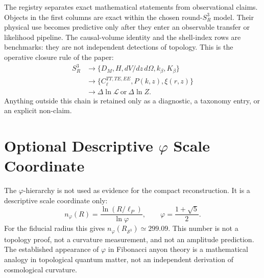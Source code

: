 \documentclass[aps,prd,onecolumn,superscriptaddress,longbibliography,nofootinbib,notitlepage]{revtex4-2}
\begin{document}
The registry separates exact mathematical statements from observational claims.
Objects in the first columns are exact within the chosen round-$S^3_R$ model.
Their physical use becomes predictive only after they enter an observable transfer
or likelihood pipeline. The causal-volume identity and the shell-index rows are
benchmarks: they are not independent detections of topology. This is the operative
closure rule of the paper:
\begin{equation}
\begin{aligned}
  S^3_R
  &\longrightarrow
  \{D_M,H,dV/dz\,d\Omega,k_\beta,K_\beta\} \\
  &\longrightarrow
  \{C_\ell^{TT,TE,EE},P(k,z),\xi(r,z)\} \\
  &\longrightarrow
  \Delta\ln\mathcal L\ \text{or}\ \Delta\ln Z .
\end{aligned}
\end{equation}
Anything outside this chain is retained only as a diagnostic, a taxonomy entry,
or an explicit non-claim.

\clearpage

\section{Optional Descriptive \texorpdfstring{$\varphi$}{phi} Scale Coordinate}
\label{app:phi-coordinate}

The $\varphi$-hierarchy is not used as evidence for the compact reconstruction. It is a
descriptive scale coordinate only:
\begin{equation}
  n_\varphi(R)=\frac{\ln(R/\ell_P)}{\ln\varphi},
  \qquad
  \varphi=\frac{1+\sqrt5}{2}.
\end{equation}
For the fiducial radius this gives $n_\varphi(R_{\mathcal S^3})\simeq299.09$. This
number is not a topology proof, not a curvature measurement, and not an amplitude
prediction. The established appearance of $\varphi$ in Fibonacci anyon theory is a
mathematical analogy in topological quantum matter, not an independent derivation of
cosmological curvature.
\end{document}
